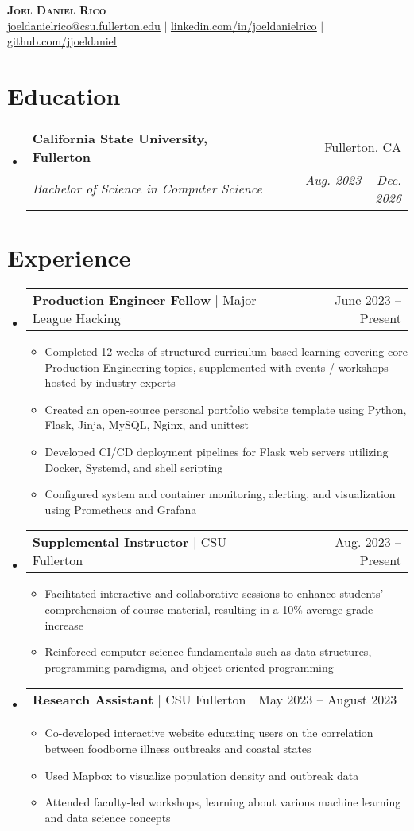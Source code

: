 \documentclass[letterpaper,11pt]{article}
\makeatletter
\newcommand{\resumeItem}[1]{
  \item\small{
    {#1 \vspace{-2pt}}
  }
}
\newcommand{\resumeSubheading}[4]{
  \vspace{-2pt}\item
    \begin{tabular*}{0.97\textwidth}[t]{l@{\extracolsep{\fill}}r}
      \textbf{#1} & #2 \\
      \textit{\small#3} & \textit{\small #4} \\
    \end{tabular*}\vspace{-7pt}
}
\newcommand{\resumeProjectHeading}[2]{
    \item
    \begin{tabular*}{0.97\textwidth}{l@{\extracolsep{\fill}}r}
      \small#1 & #2 \\
    \end{tabular*}\vspace{-7pt}
}
\newcommand{\resumeSubHeadingListStart}{\begin{itemize}[leftmargin=0.15in, label={}]}
\newcommand{\resumeSubHeadingListEnd}{\end{itemize}}
\newcommand{\resumeItemListStart}{\begin{itemize}}
\newcommand{\resumeItemListEnd}{\end{itemize}\vspace{-5pt}}
\makeatother
\begin{document}
\begin{center}
    \textbf{\Huge \scshape Joel Daniel Rico} \\ \vspace{1pt}
    \small \href{mailto:joeldanielrico@csu.fullerton.edu.com}{\underline{joeldanielrico@csu.fullerton.edu}} $|$ 
    \href{https://linkedin.com/in/joeldanielrico}{\underline{linkedin.com/in/joeldanielrico}} $|$
    \href{https://github.com/jjoeldaniel}{\underline{github.com/jjoeldaniel }}
\end{center}

\section{Education}
  \resumeSubHeadingListStart
    \resumeSubheading
      {California State University, Fullerton}{Fullerton, CA}
      {Bachelor of Science in Computer Science}{Aug. 2023 -- Dec. 2026}
  \resumeSubHeadingListEnd

\section{Experience}
  \resumeSubHeadingListStart
    \resumeProjectHeading
          {\textbf{Production Engineer Fellow} $|$ {Major League Hacking}}{June 2023 -- Present}
          \resumeItemListStart
            \resumeItem{Completed 12-weeks of structured curriculum-based learning covering core Production Engineering topics, supplemented with events / workshops hosted by industry experts}
            \resumeItem{Created an open-source personal portfolio website template using Python, Flask, Jinja, MySQL, Nginx, and unittest}
            \resumeItem{Developed CI/CD deployment pipelines for Flask web servers utilizing Docker, Systemd, and shell scripting}
            \resumeItem{Configured system and container monitoring, alerting, and visualization using Prometheus and Grafana}
          \resumeItemListEnd
    \resumeProjectHeading
          {\textbf{Supplemental Instructor} $|$ {CSU Fullerton}}{Aug. 2023 -- Present}
          \resumeItemListStart
            \resumeItem{Facilitated interactive and collaborative sessions to enhance students' comprehension of course material, resulting in a 10\% average grade increase}
            \resumeItem{Reinforced computer science fundamentals such as data structures, programming paradigms, and object oriented programming}
          \resumeItemListEnd
    \resumeProjectHeading
          {\textbf{Research Assistant} $|$ {CSU Fullerton}}{May 2023 -- August 2023}
          \resumeItemListStart
            \resumeItem{Co-developed interactive website educating users on the correlation between foodborne illness outbreaks and coastal states}
            \resumeItem{Used Mapbox to visualize population density and outbreak data}
            \resumeItem{Attended faculty-led workshops, learning about various machine learning and data science concepts}
          \resumeItemListEnd
  \resumeSubHeadingListEnd
\end{document}
